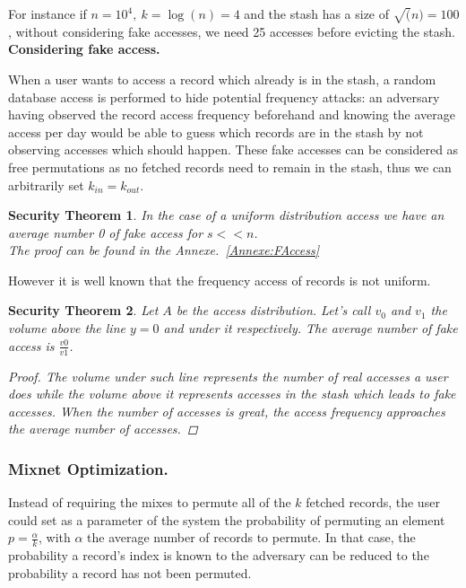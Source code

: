 \documentclass[conference]{IEEEtran}
\newtheorem{secthm}{Security Theorem}
\begin{document}
For instance if $n=10^4,\ k=\log(n)=4$ and the stash has a size of $\sqrt(n)=100$, without considering fake accesses, we need 25 accesses before evicting the stash.\\

\noindent\textbf{Considering fake access.}

When a user wants to access a record which already is in the stash, a random database access is performed to hide potential frequency attacks: an adversary having observed the record access frequency beforehand and knowing the average access per day would be able to guess which records are in the stash by not observing accesses which should happen.
These fake accesses can be considered as free permutations as no fetched records need to remain in the stash, thus we can arbitrarily set $k_{in}=k_{out}$.

\begin{secthm}
In the case of a uniform distribution access we have an average number 0 of fake access for $s<<n$.\\
The proof can be found in the Annexe.~\ref{Annexe:FAccess}
\end{secthm}

However it is well known that the frequency access of records is not uniform.
\begin{secthm}
Let $A$ be the access distribution. Let's call $v_0$ and $v_1$ the volume above the line $y=0$ and under it respectively.
The average number of fake access is $ \frac{v0}{v1}$.
\begin{proof}
 The volume under such line represents the number of real accesses a user does while the volume above it represents accesses in the stash which leads to fake accesses.
 When the number of accesses is great, the access frequency approaches the average number of accesses.
\end{proof}
\end{secthm}

\subsubsection{Mixnet Optimization.}

Instead of requiring the mixes to permute all of the $k$ fetched records, the user could set as a parameter of the system the probability of permuting an element $p=\frac{\alpha}{k}$, with $\alpha$ the average number of records to permute.
In that case, the probability a record's index is known to the adversary can be reduced to the probability a record has not been permuted.
\end{document}
